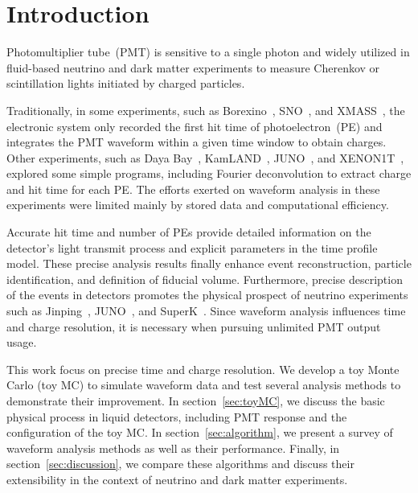 \section{Introduction}
\label{sec:introduction}

Photomultiplier tube~(PMT) is sensitive to a single photon and widely utilized in fluid-based neutrino and dark matter experiments to measure Cherenkov or scintillation lights initiated by charged particles.

Traditionally, in some experiments, such as Borexino~\cite{lagomarsino_gateless_1999}, SNO~\cite{dunger_event_2019}, and XMASS~\cite{abe_xmass_2013}, the electronic system only recorded the first hit time of photoelectron~(PE) and integrates the PMT waveform within a given time window to obtain charges. Other experiments, such as Daya Bay~\cite{huang_flash_2018}, KamLAND~\cite{the_kamland_collaboration_production_2010}, JUNO~\cite{zhang_comparison_2019}, and XENON1T~\cite{aprile_xenon1t_2019}, explored some simple programs, including Fourier deconvolution to extract charge and hit time for each PE. The efforts exerted on waveform analysis in these experiments were limited mainly by stored data and computational efficiency. 

Accurate hit time and number of PEs provide detailed information on the detector's light transmit process and explicit parameters in the time profile model. These precise analysis results finally enhance event reconstruction, particle identification, and definition of fiducial volume. Furthermore, precise description of the events in detectors promotes the physical prospect of neutrino experiments such as Jinping~\cite{beacom_physics_2017}, JUNO~\cite{an_neutrino_2016}, and SuperK~\cite{noauthor_super-kamiokande_2003}. Since waveform analysis influences time and charge resolution, it is necessary when pursuing unlimited PMT output usage. 

This work focus on precise time and charge resolution. We develop a toy Monte Carlo (toy MC) to simulate waveform data and test several analysis methods to demonstrate their improvement. In section~\ref{sec:toyMC}, we discuss the basic physical process in liquid detectors, including PMT response and the configuration of the toy MC. In section~\ref{sec:algorithm}, we present a survey of waveform analysis methods as well as their performance. Finally, in section~\ref{sec:discussion}, we compare these algorithms and discuss their extensibility in the context of neutrino and dark matter experiments. 
